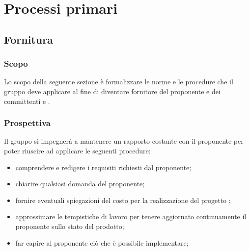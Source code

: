 \section{Processi primari}
\subsection{Fornitura}
\subsubsection{Scopo}
Lo scopo della seguente sezione è formalizzare le norme e le procedure che il gruppo \Gruppo{} deve applicare al fine di diventare fornitore del proponente \Proponente{} e dei committenti \VT{} e \CR{}.

\subsubsection{Prospettiva}
Il gruppo si impegnerà a mantenere un rapporto costante con il proponente per poter riuscire ad applicare le seguenti procedure:
\begin{itemize}
	\item comprendere e redigere i requisiti richiesti dal proponente;
	\item chiarire qualsiasi domanda del proponente;
	\item fornire eventuali spiegazioni del costo per la realizzazione del progetto \NomeProgetto{};
	\item approssimare le tempistiche di lavoro per tenere aggiornato continuamente il proponente sullo stato del prodotto; 
	\item far capire al proponente ciò che è possibile implementare;
\end{itemize}

